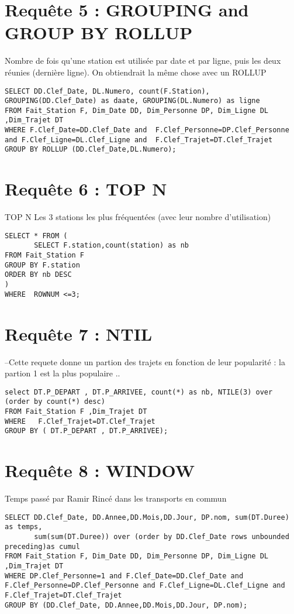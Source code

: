 \section{Requête 5 : GROUPING and GROUP BY ROLLUP}
Nombre de fois qu'une station est utilisée par date et par ligne, puis les deux réunies (dernière ligne). On obtiendrait la même chose avec un ROLLUP
\begin{verbatim}
SELECT DD.Clef_Date, DL.Numero, count(F.Station), GROUPING(DD.Clef_Date) as daate, GROUPING(DL.Numero) as ligne
FROM Fait_Station F, Dim_Date DD, Dim_Personne DP, Dim_Ligne DL ,Dim_Trajet DT
WHERE F.Clef_Date=DD.Clef_Date and  F.Clef_Personne=DP.Clef_Personne and F.Clef_Ligne=DL.Clef_Ligne and  F.Clef_Trajet=DT.Clef_Trajet
GROUP BY ROLLUP (DD.Clef_Date,DL.Numero);
\end{verbatim}

\section{Requête 6 : TOP N}
TOP N Les 3 stations les plus fréquentées (avec leur nombre d'utilisation)
\begin{verbatim}
SELECT * FROM (
       SELECT F.station,count(station) as nb
FROM Fait_Station F
GROUP BY F.station
ORDER BY nb DESC
)
WHERE  ROWNUM <=3; 
\end{verbatim}

\section{Requête 7 : NTIL}
--Cette requete donne un partion des trajets en fonction de leur popularité : la partion 1 est la plus populaire ..
\begin{verbatim}
select DT.P_DEPART , DT.P_ARRIVEE, count(*) as nb, NTILE(3) over (order by count(*) desc) 
FROM Fait_Station F ,Dim_Trajet DT
WHERE   F.Clef_Trajet=DT.Clef_Trajet
GROUP BY ( DT.P_DEPART , DT.P_ARRIVEE); 
\end{verbatim}

\section{Requête 8 : WINDOW}
Temps passé par Ramir Rincé dans les transports en commun
\begin{verbatim}
SELECT DD.Clef_Date, DD.Annee,DD.Mois,DD.Jour, DP.nom, sum(DT.Duree) as temps,
       sum(sum(DT.Duree)) over (order by DD.Clef_Date rows unbounded preceding)as cumul
FROM Fait_Station F, Dim_Date DD, Dim_Personne DP, Dim_Ligne DL ,Dim_Trajet DT
WHERE DP.Clef_Personne=1 and F.Clef_Date=DD.Clef_Date and  F.Clef_Personne=DP.Clef_Personne and F.Clef_Ligne=DL.Clef_Ligne and  F.Clef_Trajet=DT.Clef_Trajet
GROUP BY (DD.Clef_Date, DD.Annee,DD.Mois,DD.Jour, DP.nom);

\end{verbatim}

